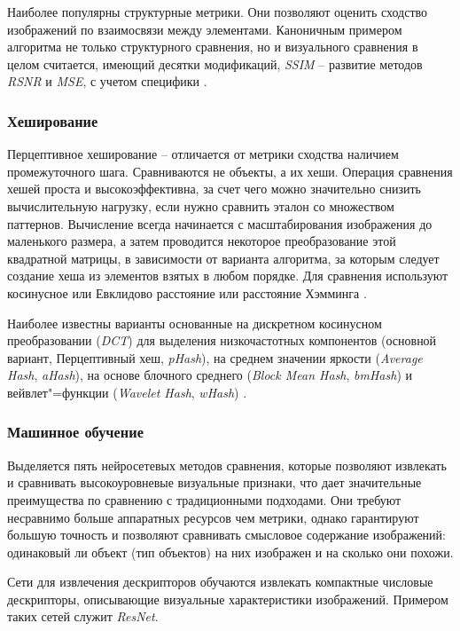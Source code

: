 Наиболее популярны структурные метрики. Они позволяют оценить сходство
изображений по взаимосвязи между элементами. Каноничным примером алгоритма не
только структурного сравнения, но и визуального сравнения в целом считается,
имеющий десятки модификаций, \textit{SSIM} -- развитие методов \textit{RSNR} и
\textit{MSE}, с учетом специфики 
\cite{wang2004image}.

\subsubsection{Хеширование}
Перцептивное хеширование -- отличается от метрики сходства наличием
промежуточного шага. Сравниваются не объекты, а их хеши. Операция сравнения
хешей проста и высокоэффективна, за счет чего можно значительно снизить
вычислительную нагрузку, если нужно сравнить эталон со множеством паттернов.
Вычисление всегда начинается с масштабирования изображения до маленького
размера, а затем проводится некоторое преобразование этой квадратной матрицы, в
зависимости от варианта алгоритма, за которым следует создание хеша из элементов
взятых в любом порядке. Для сравнения используют косинусное или Евклидово
расстояние или расстояние Хэмминга \cite{zauner2010implementation}.

Наиболее известны варианты основанные на дискретном косинусном преобразовании
(\textit{DCT}) для выделения низкочастотных компонентов (основной вариант,
Перцептивный хеш, \textit{pHash})\cite{zauner2010implementation}, на среднем
значении яркости (\textit{Average Hash}, \textit{aHash}), на основе блочного
среднего (\textit{Block Mean Hash}, \textit{bmHash}) и вейвлет"=функции
(\textit{Wavelet Hash}, \textit{wHash}) \cite{zauner2010implementation}.

\subsubsection{Машинное обучение}
Выделяется пять нейросетевых методов сравнения, которые позволяют извлекать и
сравнивать высокоуровневые визуальные признаки, что дает значительные
преимущества по сравнению с традиционными подходами. Они требуют несравнимо
больше аппаратных ресурсов чем метрики, однако гарантируют большую точность и
позволяют сравнивать смысловое содержание изображений: одинаковый ли объект (тип
объектов) на них изображен и на сколько они похожи.

Сети для извлечения дескрипторов обучаются извлекать компактные числовые
дескрипторы, описывающие визуальные характеристики изображений. Примером таких
сетей служит \textit{ResNet}\cite{simonyan2015deep}.

